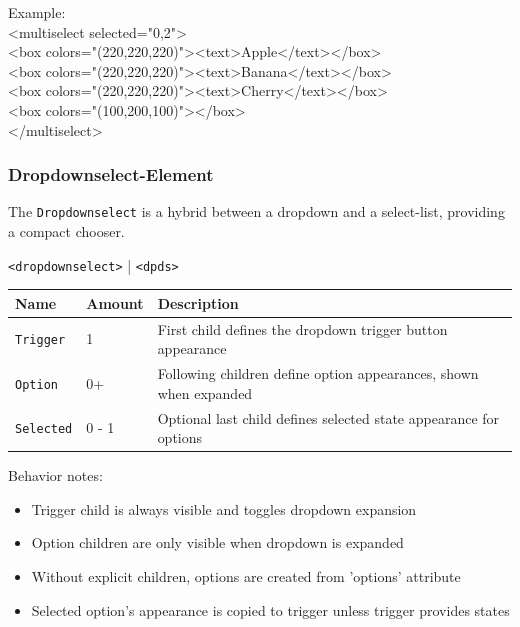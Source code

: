 \documentclass[a4paper,11pt]{article}
\begin{document}
Example:\\
<multiselect selected="0,2">\\
<box colors="(220,220,220)"><text>Apple</text></box>\\
<box colors="(220,220,220)"><text>Banana</text></box>\\
<box colors="(220,220,220)"><text>Cherry</text></box>\\
<box colors="(100,200,100)"></box>\\
</multiselect>

\newpage
\hypertarget{dropdownselect}{}
\subsubsection*{Dropdownselect-Element}
The \texttt{Dropdownselect} is a hybrid between a dropdown and a select-list, providing a compact chooser.
\begin{center}
        	\texttt{<dropdownselect>} | \texttt{<dpds>}
\end{center}

\renewcommand{\arraystretch}{1.3}
\begin{tcolorbox}[colback=white, colframe=black!75, title=Children]
\begin{tabularx}{\linewidth}{p{60pt}|p{110pt}|X}
	\textbf{Name} & \textbf{Amount} & \textbf{Description}\\
\hline
	\texttt{Trigger} & 1 & First child defines the dropdown trigger button appearance\\
\rowcolor[HTML]{E8E8E8}
	\texttt{Option} & 0+ & Following children define option appearances, shown when expanded\\
	\texttt{Selected} & 0 - 1 & Optional last child defines selected state appearance for options\\
\end{tabularx}
\end{tcolorbox}

Behavior notes:
\begin{itemize}
    \item Trigger child is always visible and toggles dropdown expansion
    \item Option children are only visible when dropdown is expanded
    \item Without explicit children, options are created from 'options' attribute
    \item Selected option's appearance is copied to trigger unless trigger provides states
\end{itemize}
\end{document}
